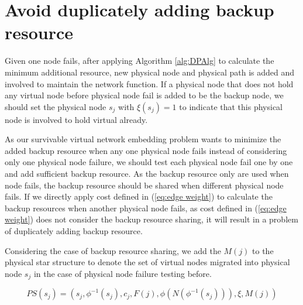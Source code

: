 
\section{Avoid  duplicately adding backup resource}
\label{sec:Avoid  duplicately adding backup resource}


Given one node fails, after applying Algorithm \ref{alg:DPAlg} to calculate the minimum additional resource, new physical node and physical path is added and involved to maintain the network function. If a physical node that does not hold any virtual node before physical node fail is added to be the backup node, we should set the physical node $s_j$ with $\xi(s_j)=1$ to indicate that this physical node is involved to hold virtual already.

As our survivable virtual network embedding problem wants to minimize the added backup resource when any one physical node fails instead of considering only one physical node failure, we should test each physical node fail one by one and add sufficient backup resource. As the backup resource only are used when node fails,  the  backup resource  should be shared when different physical node fails. If we directly apply cost defined in (\ref{eq:edge weight}) to calculate the backup resources when another physical node fails, as cost defined in (\ref{eq:edge weight}) does not consider the backup resource sharing, it will result in a problem of duplicately adding backup resource.

Considering the case of backup resource sharing,  we add the  $M(j)$ to the physical star structure to denote the set of virtual nodes migrated into  physical node $s_j$ in the case of physical node failure testing before.


\begin{equation}
PS(s_j)=(s_j, \phi^{-1}( s_j), c_j, F(j), \phi(N(\phi^{-1}( s_j))), \xi, M(j))
\end{equation}

